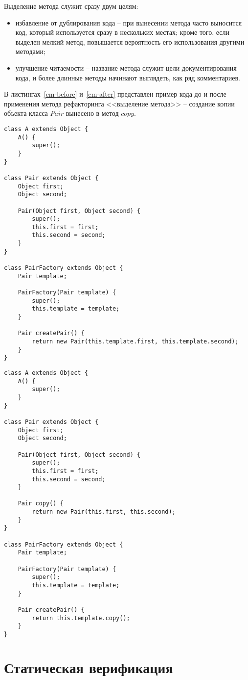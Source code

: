 Выделение метода служит сразу двум целям:
\begin{itemize}
    \item избавление от дублирования кода -- при вынесении метода часто выносится код, который используется сразу в нескольких местах;
    кроме того, если выделен мелкий метод, повышается вероятность его использования другими методами;
    \item улучшение читаемости -- название метода служит цели документирования кода,
    и более длинные методы начинают выглядеть, как ряд комментариев.
\end{itemize}
В листингах~\ref{em-before} и~\ref{em-after} представлен пример кода до и после применения метода рефакторинга <<выделение метода>> --
создание копии объекта класса $Pair$ вынесено в метод $copy$.
\lstset{
    language=Java,
    basicstyle=\small\ttfamily,
    frame=single,
    captionpos=b
}
\begin{lstlisting}[float,floatplacement=H,label=em-before,caption=Код до проведения рефакторинга]
class A extends Object {
    A() {
        super();
    }
}

class Pair extends Object {
    Object first;
    Object second;

    Pair(Object first, Object second) {
        super();
        this.first = first;
        this.second = second;
    }
}

class PairFactory extends Object {
    Pair template;

    PairFactory(Pair template) {
        super();
        this.template = template;
    }

    Pair createPair() {
        return new Pair(this.template.first, this.template.second);
    }
}
\end{lstlisting}
\begin{lstlisting}[float,floatplacement=h,label=em-after,caption=Код после вынесения метода]
class A extends Object {
    A() {
        super();
    }
}

class Pair extends Object {
    Object first;
    Object second;

    Pair(Object first, Object second) {
        super();
        this.first = first;
        this.second = second;
    }

    Pair copy() {
        return new Pair(this.first, this.second);
    }
}

class PairFactory extends Object {
    Pair template;

    PairFactory(Pair template) {
        super();
        this.template = template;
    }

    Pair createPair() {
        return this.template.copy();
    }
}
\end{lstlisting}
\section{Статическая верификация}
